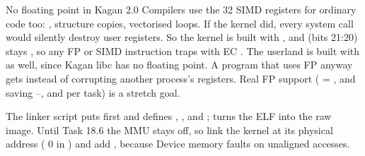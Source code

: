 \documentclass[11pt,a4paper]{article}
\begin{document}

\begin{decisionbox}{No floating point in Kagan 2.0}
Compilers use the 32 SIMD registers for ordinary code too: , structure copies, vectorised loops. If the
kernel did, every system call would silently destroy user registers. So the kernel is built with
, and  (bits 21:20) stays , so any FP or SIMD instruction
traps with EC . The userland is built with  as well, since Kagan libc has no
floating point. A program that uses FP anyway gets  instead of corrupting another process's registers.
Real FP support ( = , and saving --,  and  per task)
is a stretch goal.
\end{decisionbox}

The linker script puts  first and defines , ,  and
;  turns the ELF into the raw image. Until Task 18.6 the MMU stays
off, so link the kernel at its physical address ( 0 in ) and add
, because Device memory faults on unaligned accesses.
\end{document}
